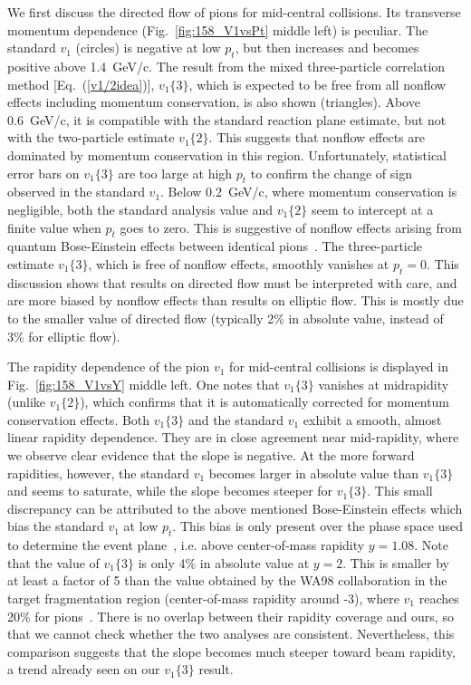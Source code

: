 \documentclass[aps,prc,superscriptaddress,showpacs,floatfix,nofootinbib]{revtex4}
\begin{document}
We first discuss the directed flow of pions for mid-central
collisions.  Its transverse momentum dependence
(Fig.~\ref{fig:158_V1vsPt} middle left) is peculiar.  The standard
$v_1$ (circles) is negative at low $p_t$, but then increases and
becomes positive above 1.4~GeV/c.  The result from the mixed
three-particle correlation method [Eq.~(\ref{v1/2idea})], $v_1\{3\}$,
which is expected to be free from all nonflow effects including
momentum conservation, is also shown (triangles).  Above 0.6~GeV/c, it
is compatible with the standard reaction plane estimate, but not with
the two-particle estimate $v_1\{2\}$.  This suggests that nonflow
effects are dominated by momentum conservation in this region.
Unfortunately, statistical error bars on $v_1\{3\}$ are too large at
high $p_t$ to confirm the change of sign observed in the standard
$v_1$.  Below 0.2~GeV/c, where momentum conservation is negligible,
both the standard analysis value and $v_1\{2\}$ seem to intercept at a
finite value when $p_t$ goes to zero.  This is suggestive of nonflow
effects arising from quantum Bose-Einstein effects between identical
pions~\cite{Dinh:1999mn}.  The three-particle estimate $v_1\{3\}$,
which is free of nonflow effects, smoothly vanishes at $p_t=0$.  This
discussion shows that results on directed flow must be interpreted
with care, and are more biased by nonflow effects than results on
elliptic flow. This is mostly due to the smaller value of directed
flow (typically 2\% in absolute value, instead of 3\% for elliptic
flow).

The rapidity dependence of the pion $v_1$ for mid-central collisions
is displayed in Fig.~\ref{fig:158_V1vsY} middle left.  One notes that
$v_1\{3\}$ vanishes at midrapidity (unlike $v_1\{2\}$), which confirms
that it is automatically corrected for momentum conservation effects.
Both $v_1\{3\}$ and the standard $v_1$ exhibit a smooth, almost linear
rapidity dependence. They are in close agreement near mid-rapidity,
where we observe clear evidence that the slope is negative. At the
more forward rapidities, however, the standard $v_1$ becomes larger in
absolute value than $v_1\{3\}$ and seems to saturate, while the slope
becomes steeper for $v_1\{3\}$. This small discrepancy can be
attributed to the above mentioned Bose-Einstein effects which bias the
standard $v_1$ at low $p_t$. This bias is only present over the phase
space used to determine the event plane~\cite{Dinh:1999mn}, i.e. above
center-of-mass rapidity $y=1.08$.  Note that the value of $v_1\{3\}$
is only 4\% in absolute value at $y=2$. This is smaller by at least a
factor of 5 than the value obtained by the WA98 collaboration in the
target fragmentation region (center-of-mass rapidity around -3), where
$v_1$ reaches 20\% for pions~\cite{Aggarwal:1998vg}.  There is no
overlap between their rapidity coverage and ours, so that we cannot
check whether the two analyses are consistent.  Nevertheless, this
comparison suggests that the slope becomes much steeper toward beam
rapidity, a trend already seen on our $v_1\{3\}$ result.
\end{document}
